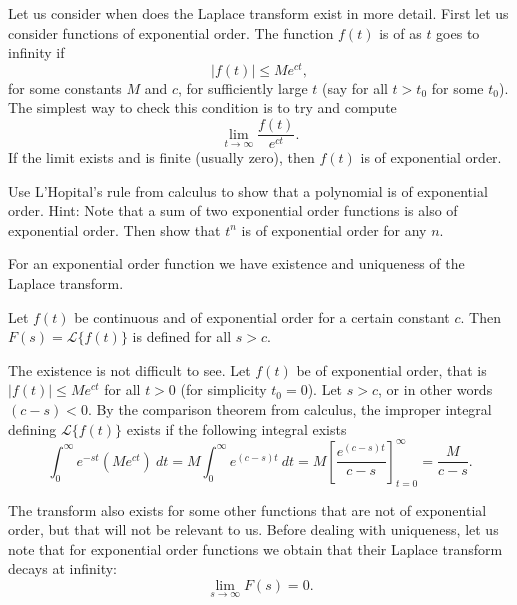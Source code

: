 \documentclass[12pt]{book}
\begin{document}
Let us consider when does the Laplace transform exist in more detail.  First
let us consider functions of exponential order.  The function $f(t)$ is of
\emph{} as $t$ goes to infinity if
\begin{equation*}
\lvert f(t) \rvert \leq M e^{ct} ,
\end{equation*}
for some constants $M$ and $c$, for
sufficiently large $t$ (say for all $t > t_0$ for some $t_0$).  The simplest
way to check this condition is to try and compute
\begin{equation*}
\lim_{t\to \infty} \frac{f(t)}{e^{ct}} .
\end{equation*}
If the limit exists and is finite (usually zero), then $f(t)$ is of
exponential order.

\begin{exercise}
Use L'Hopital's rule from calculus to show that a polynomial is of
exponential order.  Hint: Note that a sum of two exponential order functions
is also of exponential order.  Then show that $t^n$ is of exponential order
for any $n$.
\end{exercise}

For an exponential order function we have existence and uniqueness of the
Laplace transform.

\begin{theorem}[Existence]
Let $f(t)$ be continuous and of exponential order for a certain
constant $c$.  Then $F(s) = \mathcal{L} \{ f(t) \}$ is defined for
all $s > c$.
\end{theorem}

The existence is not difficult to see.  Let $f(t)$ be of exponential order,
that is $\lvert f(t) \rvert \leq M e^{ct}$ for all $t > 0$ (for simplicity $t_0 = 0$).
Let $s > c$, or in other words $(c-s) < 0$.
By the comparison theorem from calculus, the improper integral defining
$\mathcal{L} \{ f(t) \}$ exists if the following integral exists
\begin{equation*}
\int_0^\infty e^{-st} ( M e^{ct} ) ~dt
=
M \int_0^\infty e^{(c-s)t} ~dt = M \left[ \frac{e^{(c-s)t}}{c-s}
\right]_{t=0}^\infty = \frac{M}{c-s} .
\end{equation*}

The transform also exists for some other functions
that are not of exponential
order, but that will not be relevant to us.
Before dealing with uniqueness, let
us note that for exponential order functions we obtain that their
Laplace transform decays at infinity:
\begin{equation*}
\lim_{s\to\infty} F(s) = 0 .
\end{equation*}
\end{document}
